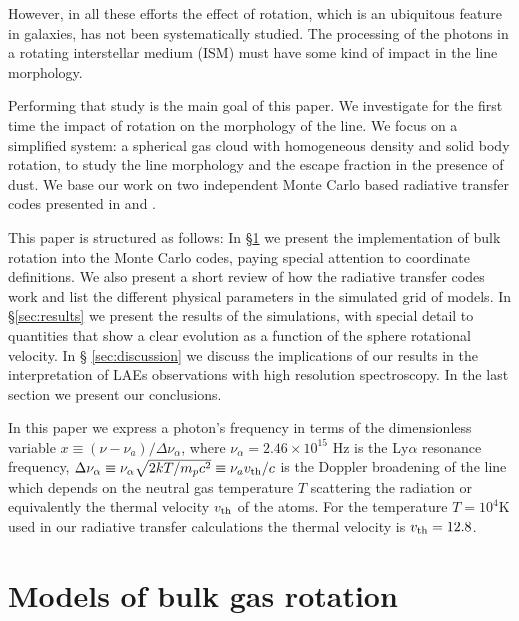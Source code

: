 \documentclass{emulateapj}
\newcommand{\ly}{{\ifmmode{{\rm Ly}\alpha~}\else{Ly$\alpha$~}\fi}}
\newcommand{\kms}{{\ifmmode{{\mathrm{\,km\ s}^{-1}}}\else{\,km~s$^{-1}$}\fi}}
\begin{document}
However, in all these efforts the effect of rotation,
which is an ubiquitous feature in galaxies, has not been
systematically studied. The processing of the \ly photons in a
rotating interstellar medium (ISM) must have some kind of impact in
the \ly line morphology. 

Performing that study is the main goal of this paper. We investigate for the
first time the impact of rotation on the morphology of the \ly
line. We focus on a simplified system: a spherical gas cloud with
homogeneous density and solid body rotation, to study the line
morphology and the escape fraction in the presence of dust. We base
our work on two independent Monte Carlo based radiative transfer codes
presented in \cite{CLARA} and \cite{DijkstraKramer}.   
  
This paper is structured as follows: In \S \ref{sec:implementation} we
present the implementation of bulk rotation into the Monte Carlo
codes, paying special attention to coordinate definitions. We also
present a short review of how the \ly radiative transfer codes work
and list the different physical parameters in the simulated grid of
models. In \S \ref{sec:results} we present the results of the
simulations, with special detail to quantities that show a
clear evolution as a function of the sphere rotational velocity. In \S
\ref{sec:discussion} we discuss the implications of our results in the
interpretation of LAEs observations with high resolution
spectroscopy. In the last section we present our conclusions.    


In this paper we express a photon's frequency in terms of the
dimensionless variable $x\equiv (\nu -\nu_a)/\Delta\nu_\alpha$, where
$\nu_{\alpha}=2.46\times 10^{15}$ Hz is the Ly$\alpha$ resonance
frequency,  $\Delta\nu_{\alpha} \equiv
\nu_{\alpha}\sqrt{2kT/m_pc^2}\equiv \nu_av_{\rm th}/c $ is the Doppler
broadening of the line which depends on the neutral gas temperature
$T$ scattering the radiation or equivalently the thermal velocity
$v_{\rm th}$ of the atoms.  For the temperature $T=10^4$K used in our
radiative transfer calculations the thermal velocity is
$v_{\rm th}=12.8$\kms.  




\section{Models of bulk gas rotation}
\label{sec:implementation}
\end{document}

